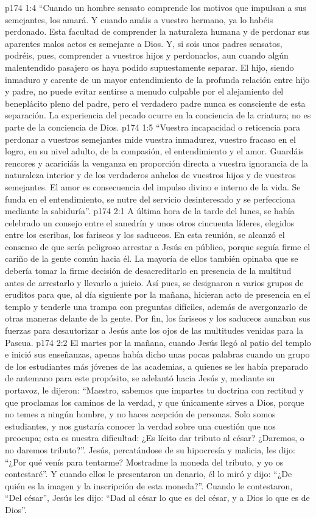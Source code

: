 \vs p174 1:4 “Cuando un hombre sensato comprende los motivos que impulsan a sus semejantes, los amará. Y cuando amáis a vuestro hermano, ya lo habéis perdonado. Esta facultad de comprender la naturaleza humana y de perdonar sus aparentes malos actos es semejarse a Dios. Y, si sois unos padres sensatos, podréis, pues, comprender a vuestros hijos y perdonarlos, aun cuando algún malentendido pasajero os haya podido supuestamente separar. El hijo, siendo inmaduro y carente de un mayor entendimiento de la profunda relación entre hijo y padre, no puede evitar sentirse a menudo culpable por el alejamiento del beneplácito pleno del padre, pero el verdadero padre nunca es consciente de esta separación. La experiencia del pecado ocurre en la conciencia de la criatura; no es parte de la conciencia de Dios.
\vs p174 1:5 “Vuestra incapacidad o reticencia para perdonar a vuestros semejantes mide vuestra inmadurez, vuestro fracaso en el logro, en su nivel adulto, de la compasión, el entendimiento y el amor. Guardáis rencores y acariciáis la venganza en proporción directa a vuestra ignorancia de la naturaleza interior y de los verdaderos anhelos de vuestros hijos y de vuestros semejantes. El amor es consecuencia del impulso divino e interno de la vida. Se funda en el entendimiento, se nutre del servicio desinteresado y se perfecciona mediante la sabiduría”.
\vs p174 2:1 A última hora de la tarde del lunes, se había celebrado un consejo entre el sanedrín y unos otros cincuenta líderes, elegidos entre los escribas, los fariseos y los saduceos. En esta reunión, se alcanzó el consenso de que sería peligroso arrestar a Jesús en público, porque seguía firme el cariño de la gente común hacia él. La mayoría de ellos también opinaba que se debería tomar la firme decisión de desacreditarlo en presencia de la multitud antes de arrestarlo y llevarlo a juicio. Así pues, se designaron a varios grupos de eruditos para que, al día siguiente por la mañana, hicieran acto de presencia en el templo y tenderle una trampa con preguntas difíciles, además de avergonzarlo de otras maneras delante de la gente. Por fin, los fariseos y los saduceos aunaban sus fuerzas para desautorizar a Jesús ante los ojos de las multitudes venidas para la Pascua.
\vs p174 2:2 El martes por la mañana, cuando Jesús llegó al patio del templo e inició sus enseñanzas, apenas había dicho unas pocas palabras cuando un grupo de los estudiantes más jóvenes de las academias, a quienes se les había preparado de antemano para este propósito, se adelantó hacia Jesús y, mediante su portavoz, le dijeron: “Maestro, sabemos que impartes tu doctrina con rectitud y que proclamas los caminos de la verdad, y que únicamente sirves a Dios, porque no temes a ningún hombre, y no haces acepción de personas. Solo somos estudiantes, y nos gustaría conocer la verdad sobre una cuestión que nos preocupa; esta es nuestra dificultad: ¿Es lícito dar tributo al césar? ¿Daremos, o no daremos tributo?”. Jesús, percatándose de su hipocresía y malicia, les dijo: “¿Por qué venís para tentarme? Mostradme la moneda del tributo, y yo os contestaré”. Y cuando ellos le presentaron un denario, él lo miró y dijo: “¿De quién es la imagen y la inscripción de esta moneda?”. Cuando le contestaron, “Del césar”, Jesús les dijo: “Dad al césar lo que es del césar, y a Dios lo que es de Dios”.
